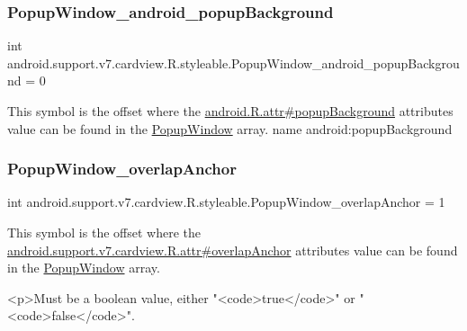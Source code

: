 \subsubsection{\texorpdfstring{Popup\+Window\+\_\+android\+\_\+popup\+Background}{PopupWindow\_android\_popupBackground}}
{\footnotesize\ttfamily int android.\+support.\+v7.\+cardview.\+R.\+styleable.\+Popup\+Window\+\_\+android\+\_\+popup\+Background = 0\hspace{0.3cm}{\ttfamily [static]}}

This symbol is the offset where the \hyperlink{}{android.\+R.\+attr\#popup\+Background} attribute\textquotesingle{}s value can be found in the \hyperlink{classandroid_1_1support_1_1v7_1_1cardview_1_1R_1_1styleable_a516f08a3eae6bcc7fe5755c9605d8bc7}{Popup\+Window} array.  name android\+:popup\+Background \mbox{\label{classandroid_1_1support_1_1v7_1_1cardview_1_1R_1_1styleable_a763d335d6dc14add084daf0179491e94}} 
\subsubsection{\texorpdfstring{Popup\+Window\+\_\+overlap\+Anchor}{PopupWindow\_overlapAnchor}}
{\footnotesize\ttfamily int android.\+support.\+v7.\+cardview.\+R.\+styleable.\+Popup\+Window\+\_\+overlap\+Anchor = 1\hspace{0.3cm}{\ttfamily [static]}}

This symbol is the offset where the \hyperlink{classandroid_1_1support_1_1v7_1_1cardview_1_1R_1_1attr_a45f20b43e5ada98f00d472a27f414032}{android.\+support.\+v7.\+cardview.\+R.\+attr\#overlap\+Anchor} attribute\textquotesingle{}s value can be found in the \hyperlink{classandroid_1_1support_1_1v7_1_1cardview_1_1R_1_1styleable_a516f08a3eae6bcc7fe5755c9605d8bc7}{Popup\+Window} array.

\begin{DoxyVerb}      <p>Must be a boolean value, either "<code>true</code>" or "<code>false</code>".
\end{DoxyVerb}
 

